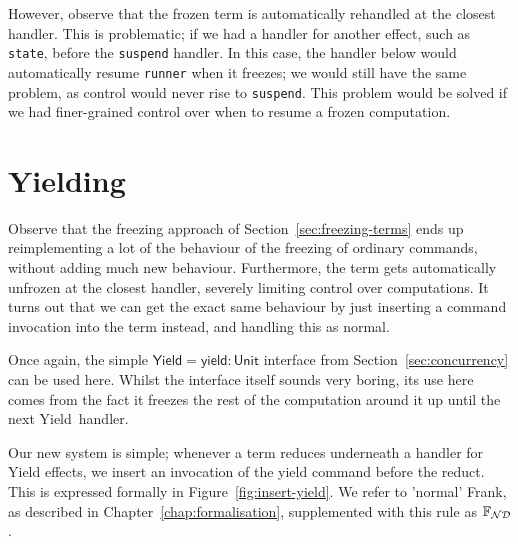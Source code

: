 \documentclass[msc,deptreport,cs]{infthesis} %
\newcommand{\code}[1]{\lstinline{#1}}
\newcommand\nondetfrank{$\mathbb{F}_{\cal{ND}}$}
\newcommand\yield{\textsf{yield}\xspace}
\newcommand\Yield{\textsf{Yield}\xspace}
\newcommand{\todo}[1]
           {{\par\noindent\small\color{RoyalPurple}
  \framebox{\parbox{\dimexpr\linewidth-2\fboxsep-2\fboxrule}
    {\textbf{TODO:} #1}}}}
\begin{document}
However, observe that the frozen term is automatically rehandled at the closest
handler. This is problematic; if we had a handler for another effect, such as
\code{state}, before the \code{suspend} handler. In this case, the handler below
would automatically resume \code{runner} when it freezes; we would still have
the same problem, as control would never rise to \code{suspend}. This problem
would be solved if we had finer-grained control over when to resume a frozen
computation.

\todo{Rewrite above paragraph}

\section{Yielding}
\label{sec:inserting-yields}

Observe that the freezing approach of Section~\ref{sec:freezing-terms} ends up
reimplementing a lot of the behaviour of the freezing of ordinary commands,
without adding much new behaviour. Furthermore, the term gets automatically
unfrozen at the closest handler, severely limiting control over computations. It
turns out that we can get the exact same behaviour by just inserting a command
invocation into the term instead, and handling this as normal.
%

Once again, the simple $\Yield = \yield : \textsf{Unit}$ interface from
Section~\ref{sec:concurrency} can be used here. Whilst the interface itself
sounds very boring, its use here comes from the fact it freezes the rest of the
computation around it up until the next \Yield~handler.


Our new system is simple; whenever a term reduces underneath a handler for
\Yield effects, we insert an invocation of the \yield command before the reduct.
This is expressed formally in Figure~\ref{fig:insert-yield}. We refer to
'normal' Frank, as described in Chapter~\ref{chap:formalisation}, supplemented
with this rule as \nondetfrank.
\end{document}
